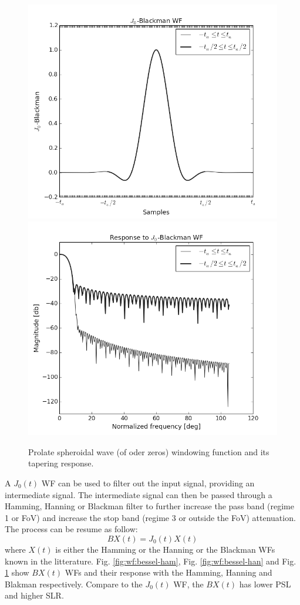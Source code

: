 \documentclass[useAMS,usenatbib]{mn2e}
\begin{document}
\begin{figure}
\includegraphics[width=.5\textwidth]{./Figures/bessel-blackmangrey.png}%
\includegraphics[width=.5\textwidth]{./Figures/freq_resp_bessel-blackmangrey.png}
\caption{Prolate spheroidal wave (of oder zeros) windowing function and its tapering response.}\label{fig:wf:bessel-black}
\end{figure}
A $J_0(t)$ WF can be used to filter out the input signal, providing an intermediate signal. The intermediate signal 
can then be passed through a Hamming, Hanning or Blackman filter to further increase the pass band (regime 1 or FoV) and 
increase the stop band (regime 3 or outside the FoV) attenuation. The process can be resume as follow:
\begin{equation}
BX(t)= J_0(t)X(t) 
\end{equation}
where $X(t)$ is either the Hamming or the Hanning or the Blackman WFs known in the litterature.
Fig. \ref{fig:wf:bessel-ham}, Fig. \ref{fig:wf:bessel-han} and Fig. \ref{fig:wf:bessel-black}  show $BX(t)$ WFs and their
response with the Hamming, Hanning and Blakman respectively. Compare to the $J_0(t)$ WF, the $BX(t)$ has lower PSL and higher SLR.
\end{document}
